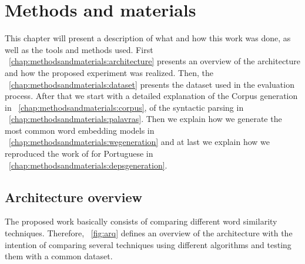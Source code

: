 \section{Methods and materials}\label{chap:methodsandmaterials}

This chapter will present a description of what and how this work was done, as well as the tools and methods used. First ~\autoref{chap:methodsandmaterials:architecture} presents an overview of the architecture and how the proposed experiment was realized. Then, the ~\autoref{chap:methodsandmaterials:dataset} presents the dataset used in the evaluation process. After that we start with a detailed explanation of the Corpus generation in ~\autoref{chap:methodsandmaterials:corpus}, of the syntactic parsing in ~\autoref{chap:methodsandmaterials:palavras}. Then we explain how we generate the most common word embedding models in ~\autoref{chap:methodsandmaterials:wegeneration} and at last we explain how we reproduced the work of  for Portuguese in ~\autoref{chap:methodsandmaterials:depsgeneration}.

\subsection{Architecture overview}\label{chap:methodsandmaterials:architecture}

The proposed work basically consists of comparing different word similarity techniques. Therefore, ~\autoref{fig:arq} defines an overview of the architecture with the intention of comparing several techniques using different algorithms and testing them with a common dataset.

